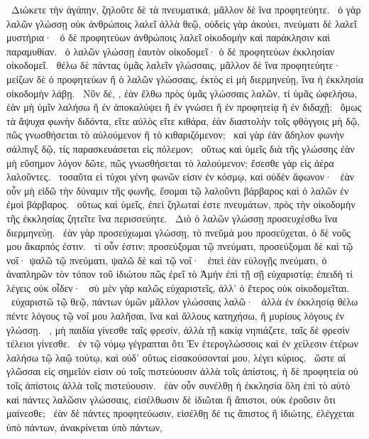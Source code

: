 ~Διώκετε τὴν ἀγάπην, ζηλοῦτε δὲ τὰ πνευματικά, μᾶλλον δὲ ἵνα προφητεύητε.
~ὁ γὰρ λαλῶν γλώσσῃ οὐκ ἀνθρώποις λαλεῖ ἀλλὰ θεῷ, οὐδεὶς γὰρ ἀκούει, πνεύματι δὲ λαλεῖ μυστήρια·
~ὁ δὲ προφητεύων ἀνθρώποις λαλεῖ οἰκοδομὴν καὶ παράκλησιν καὶ παραμυθίαν.
~ὁ λαλῶν γλώσσῃ ἑαυτὸν οἰκοδομεῖ· ὁ δὲ προφητεύων ἐκκλησίαν οἰκοδομεῖ.
~θέλω δὲ πάντας ὑμᾶς λαλεῖν γλώσσαις, μᾶλλον δὲ ἵνα προφητεύητε· μείζων δὲ ὁ προφητεύων ἢ ὁ λαλῶν γλώσσαις, ἐκτὸς εἰ μὴ διερμηνεύῃ, ἵνα ἡ ἐκκλησία οἰκοδομὴν λάβῃ.
~Νῦν δέ, , ἐὰν ἔλθω πρὸς ὑμᾶς γλώσσαις λαλῶν, τί ὑμᾶς ὠφελήσω, ἐὰν μὴ ὑμῖν λαλήσω ἢ ἐν ἀποκαλύψει ἢ ἐν γνώσει ἢ ἐν προφητείᾳ ἢ ἐν διδαχῇ;
~ὅμως τὰ ἄψυχα φωνὴν διδόντα, εἴτε αὐλὸς εἴτε κιθάρα, ἐὰν διαστολὴν τοῖς φθόγγοις μὴ δῷ, πῶς γνωσθήσεται τὸ αὐλούμενον ἢ τὸ κιθαριζόμενον;
~καὶ γὰρ ἐὰν ἄδηλον φωνὴν σάλπιγξ δῷ, τίς παρασκευάσεται εἰς πόλεμον;
~οὕτως καὶ ὑμεῖς διὰ τῆς γλώσσης ἐὰν μὴ εὔσημον λόγον δῶτε, πῶς γνωσθήσεται τὸ λαλούμενον; ἔσεσθε γὰρ εἰς ἀέρα λαλοῦντες.
~τοσαῦτα εἰ τύχοι γένη φωνῶν εἰσιν ἐν κόσμῳ, καὶ οὐδὲν ἄφωνον·
~ἐὰν οὖν μὴ εἰδῶ τὴν δύναμιν τῆς φωνῆς, ἔσομαι τῷ λαλοῦντι βάρβαρος καὶ ὁ λαλῶν ἐν ἐμοὶ βάρβαρος.
~οὕτως καὶ ὑμεῖς, ἐπεὶ ζηλωταί ἐστε πνευμάτων, πρὸς τὴν οἰκοδομὴν τῆς ἐκκλησίας ζητεῖτε ἵνα περισσεύητε.
~Διὸ ὁ λαλῶν γλώσσῃ προσευχέσθω ἵνα διερμηνεύῃ.
~ἐὰν γὰρ προσεύχωμαι γλώσσῃ, τὸ πνεῦμά μου προσεύχεται, ὁ δὲ νοῦς μου ἄκαρπός ἐστιν.
~τί οὖν ἐστιν; προσεύξομαι τῷ πνεύματι, προσεύξομαι δὲ καὶ τῷ νοΐ· ψαλῶ τῷ πνεύματι, ψαλῶ δὲ καὶ τῷ νοΐ·
~ἐπεὶ ἐὰν εὐλογῇς πνεύματι, ὁ ἀναπληρῶν τὸν τόπον τοῦ ἰδιώτου πῶς ἐρεῖ τὸ Ἀμήν ἐπὶ τῇ σῇ εὐχαριστίᾳ; ἐπειδὴ τί λέγεις οὐκ οἶδεν·
~σὺ μὲν γὰρ καλῶς εὐχαριστεῖς, ἀλλ’ ὁ ἕτερος οὐκ οἰκοδομεῖται.
~εὐχαριστῶ τῷ θεῷ, πάντων ὑμῶν μᾶλλον γλώσσαις λαλῶ·
~ἀλλὰ ἐν ἐκκλησίᾳ θέλω πέντε λόγους τῷ νοΐ μου λαλῆσαι, ἵνα καὶ ἄλλους κατηχήσω, ἢ μυρίους λόγους ἐν γλώσσῃ.
~, μὴ παιδία γίνεσθε ταῖς φρεσίν, ἀλλὰ τῇ κακίᾳ νηπιάζετε, ταῖς δὲ φρεσὶν τέλειοι γίνεσθε.
~ἐν τῷ νόμῳ γέγραπται ὅτι Ἐν ἑτερογλώσσοις καὶ ἐν χείλεσιν ἑτέρων λαλήσω τῷ λαῷ τούτῳ, καὶ οὐδ’ οὕτως εἰσακούσονταί μου, λέγει κύριος.
~ὥστε αἱ γλῶσσαι εἰς σημεῖόν εἰσιν οὐ τοῖς πιστεύουσιν ἀλλὰ τοῖς ἀπίστοις, ἡ δὲ προφητεία οὐ τοῖς ἀπίστοις ἀλλὰ τοῖς πιστεύουσιν.
~ἐὰν οὖν συνέλθῃ ἡ ἐκκλησία ὅλη ἐπὶ τὸ αὐτὸ καὶ πάντες λαλῶσιν γλώσσαις, εἰσέλθωσιν δὲ ἰδιῶται ἢ ἄπιστοι, οὐκ ἐροῦσιν ὅτι μαίνεσθε;
~ἐὰν δὲ πάντες προφητεύωσιν, εἰσέλθῃ δέ τις ἄπιστος ἢ ἰδιώτης, ἐλέγχεται ὑπὸ πάντων, ἀνακρίνεται ὑπὸ πάντων,
